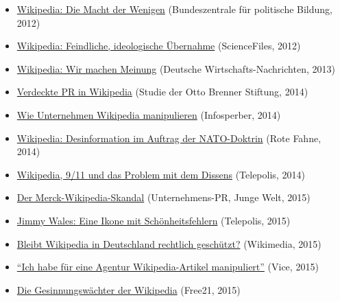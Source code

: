 \begin{itemize}
\tightlist
\item
  \href{http://www.bpb.de/gesellschaft/digitales/wikipedia/145809/die-macht-der-wenigen?p=all}{Wikipedia:
  Die Macht der Wenigen} (Bundeszentrale für politische Bildung, 2012)
\item
  \href{https://sciencefiles.org/2012/07/29/feindliche-ideologische-ubernahme-deutsche-wikipedia-droht-im-desaster-zu-enden/}{Wikipedia:
  Feindliche, ideologische Übernahme} (ScienceFiles, 2012)
\item
  \href{http://deutsche-wirtschafts-nachrichten.de/2013/11/04/wikipedia-wir-machen-meinung/}{Wikipedia:
  Wir machen Meinung} (Deutsche Wirtschafts-Nachrichten, 2013)
\item
  \href{https://www.otto-brenner-stiftung.de/wissenschaftsportal/informationsseiten-zu-studien/studien-2014/verdeckte-pr-in-wikipedia/}{Verdeckte
  PR in Wikipedia} (Studie der Otto Brenner Stiftung, 2014)
\item
  \href{https://www.infosperber.ch/Medien/Wikipedia-PR-Manipulation-Unternehmen}{Wie
  Unternehmen Wikipedia manipulieren} (Infosperber, 2014)
\item
  \href{https://rotefahne.eu/2014/01/wikipedia-desinformation-im-auftrag-der-nato-doktrin/}{Wikipedia:
  Desinformation im Auftrag der NATO-Doktrin} (Rote Fahne, 2014)
\item
  \href{https://www.heise.de/tp/features/Verschwoerungstheorie-3363979.html?seite=all}{Wikipedia,
  9/11 und das Problem mit dem Dissens} (Telepolis, 2014)
\item
  \href{http://de.pluspedia.org/wiki/Merck-Wikipedia-Skandal}{Der
  Merck-Wikipedia-Skandal} (Unternehmens-PR, Junge Welt, 2015)
\item
  \href{https://www.heise.de/tp/features/Jimmy-Wales-eine-Ikone-mit-Schoenheitsfehlern-3377061.html?seite=all}{Jimmy
  Wales: Eine Ikone mit Schönheitsfehlern} (Telepolis, 2015)
\item
  \href{https://blog.wikimedia.de/2015/03/12/monsters-of-law-nr-5-wiki-immunity-bleibt-die-wikipedia-in-deutschland-rechtlich-geschuetzt/}{Bleibt
  Wikipedia in Deutschland rechtlich geschützt?} (Wikimedia, 2015)
\item
  \href{https://www.vice.com/de/article/znky4j/wikipedia-manipulation-812}{``Ich
  habe für eine Agentur Wikipedia-Artikel manipuliert''} (Vice, 2015)
\item
  \href{http://www.free21.org/wp-content/uploads/2015/11/03-McClean-Gesinnungsw\%C3\%A4chter-Wikipedia3.pdf}{Die
  Gesinnungswächter der Wikipedia} (Free21, 2015)
\end{itemize}

